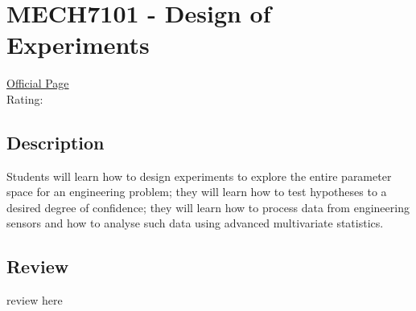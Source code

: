 \hypertarget{MECH7101}{\section{MECH7101 - Design of Experiments}}

\large
\textcolor{turbo_purple}{\href{https://my.uq.edu.au/programs-courses/course.html?course_code=MECH7101}{Official Page}} \\
Rating: \cstar\cstar\cstar\cstar\ostar

\normalsize
\subsection*{Description}
Students will learn how to design experiments to explore the entire parameter space for an engineering problem; they will learn how to test hypotheses to a desired degree of confidence; they will learn how to process data from engineering sensors and how to analyse such data using advanced multivariate statistics.

\subsection*{Review}
review here
